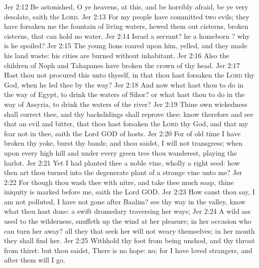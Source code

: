 \vs Jer 2:12 Be astonished, O ye heavens, at this, and be horribly afraid, be ye very desolate, saith the \textsc{Lord}.
\vs Jer 2:13 For my people have committed two evils; they have forsaken me the fountain of living waters,  hewed them out cisterns, broken cisterns, that can hold no water.
\vs Jer 2:14  Israel a servant?  he a homeborn ? why is he spoiled?
\vs Jer 2:15 The young lions roared upon him,  yelled, and they made his land waste: his cities are burned without inhabitant.
\vs Jer 2:16 Also the children of Noph and Tahapanes have broken the crown of thy head.
\vs Jer 2:17 Hast thou not procured this unto thyself, in that thou hast forsaken the \textsc{Lord} thy God, when he led thee by the way?
\vs Jer 2:18 And now what hast thou to do in the way of Egypt, to drink the waters of Sihor? or what hast thou to do in the way of Assyria, to drink the waters of the river?
\vs Jer 2:19 Thine own wickedness shall correct thee, and thy backslidings shall reprove thee: know therefore and see that  an evil  and bitter, that thou hast forsaken the \textsc{Lord} thy God, and that my fear  not in thee, saith the Lord GOD of hosts.
\vs Jer 2:20 For of old time I have broken thy yoke,  burst thy bands; and thou saidst, I will not transgress; when upon every high hill and under every green tree thou wanderest, playing the harlot.
\vs Jer 2:21 Yet I had planted thee a noble vine, wholly a right seed: how then art thou turned into the degenerate plant of a strange vine unto me?
\vs Jer 2:22 For though thou wash thee with nitre, and take thee much soap,  thine iniquity is marked before me, saith the Lord GOD.
\vs Jer 2:23 How canst thou say, I am not polluted, I have not gone after Baalim? see thy way in the valley, know what thou hast done:  a swift dromedary traversing her ways;
\vs Jer 2:24 A wild ass used to the wilderness,  snuffeth up the wind at her pleasure; in her occasion who can turn her away? all they that seek her will not weary themselves; in her month they shall find her.
\vs Jer 2:25 Withhold thy foot from being unshod, and thy throat from thirst: but thou saidst, There is no hope: no; for I have loved strangers, and after them will I go.

